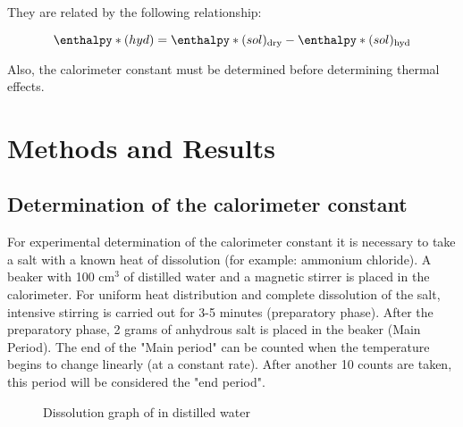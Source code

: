 \documentclass[12pt, letterpaper]{article}
\begin{document}
        They are related by the following relationship:
        
        \begin{equation}
            \enthalpy*(hyd){} = \enthalpy*(sol){}\textsubscript{dry} - \enthalpy*(sol){}\textsubscript{hyd}    
        \end{equation}
        
        Also, the calorimeter constant must be determined before determining thermal effects. 
        
    \section{Methods and Results}
    \subsection{Determination of the calorimeter constant}
   
    For experimental determination of the calorimeter constant it is necessary to take a salt
    with a known heat of dissolution (for example: ammonium chloride).
    A beaker with 100 cm$^3$ of distilled water and a magnetic stirrer is placed in the calorimeter.
    For uniform heat distribution and complete dissolution of the salt, intensive stirring is carried out for 3-5 minutes (preparatory phase).
    After the preparatory phase, 2 grams of anhydrous salt is placed in the beaker (Main Period).
    The end of the "Main period" can be counted when the temperature begins to change linearly (at a constant rate).
    After another 10 counts are taken, this period will be considered the "end period". \\
     
    \begin{figure}[h]
        \centering
        \caption{Dissolution graph of  in distilled water}
    \end{figure}
\end{document}
